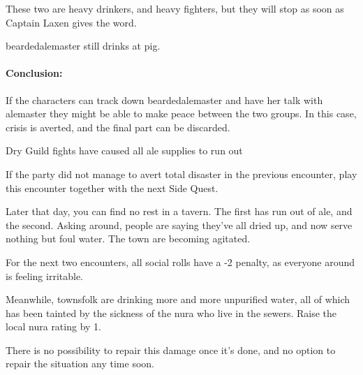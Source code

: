 \begin{multicols}{2}

These two are heavy drinkers, and heavy fighters, but they will stop as soon as Captain Laxen gives the word.


\Gls{beardedalemaster} still drinks at \gls{pig}.  

\paragraph{Conclusion:} If the characters can track down \gls{beardedalemaster} and have her talk with \gls{alemaster} they might be able to make peace between the two groups.
In this case, crisis is averted, and the final part can be discarded.

\beardedalemaster

{\N\squash Dry}%
{Guild fights have caused all ale supplies to run out}%

If the party did not manage to avert total disaster in the previous encounter, play this encounter together with the next Side Quest.

\begin{boxtext}

  Later that day, you can find no rest in a tavern.  The first has run out of ale, and the second.  Asking around, people are saying they've all dried up, and now serve nothing but foul water.  The town are becoming agitated.

\end{boxtext}

For the next two encounters, all social rolls have a -2 penalty, as everyone around is feeling irritable.

Meanwhile, townsfolk are drinking more and more unpurified water, all of which has been tainted by the sickness of the nura who live in the sewers.  Raise the local nura rating by 1.

There is no possibility to repair this damage once it's done, and no option to repair the situation any time soon.

\stopcontents[sq]



\resumecontents[Villages]
\label{lizardite}
\stopcontents[Villages]

\startcontents[sq]

\sqminitoc


\end{multicols}
